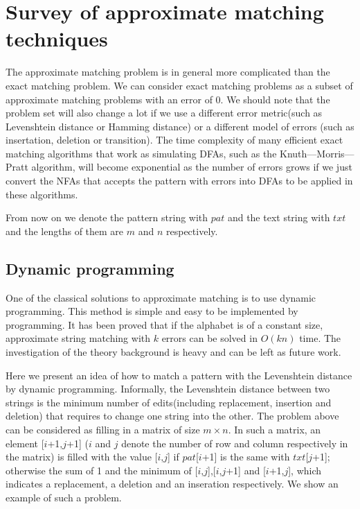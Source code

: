 \section{Survey of approximate matching techniques}
The approximate matching problem is in general more complicated than the exact matching problem. We can consider exact matching problems as a subset of approximate matching problems with an error of 0. We should note that the problem set will also change a lot if we use a different error metric(such as Levenshtein distance or Hamming distance) or a different model of errors (such as insertation, deletion or transition). The time complexity of many efficient exact matching algorithms that work as simulating DFAs, such as the Knuth--–Morris--–Pratt algorithm, will become exponential as the number of errors grows if we just convert the NFAs that accepts the pattern with errors into DFAs to be applied in these algorithms. 

From now on we denote the pattern string with $pat$ and the text string with $txt$ and  the lengths of them are $m$ and $n$ respectively.

\subsection{Dynamic programming}

One of the classical solutions to approximate matching is to use dynamic programming. This method is simple and easy to be implemented by programming. It has been proved that if the alphabet is of a constant size, approximate string matching with $k$ errors can be solved in $O(kn)$ time\cite{crochemore-jewels}. The investigation of the theory background is heavy and can be left as future work.

Here we present an idea of how to match a pattern with the Levenshtein distance by dynamic programming. Informally, the Levenshtein distance between two strings is the minimum number of edits(including replacement, insertion and deletion) that requires to change one string into the other. The problem above can be considered as filling in a matrix of size $m\times n$. In such a matrix, an element [$i$+1,$j$+1] ($i$ and $j$ denote the number of row and column respectively in the matrix) is filled with the value [$i$,$j$] if $pat$[$i$+1] is the same with $txt$[$j$+1]; otherwise the sum of 1 and the minimum of [$i$,$j$],[$i$,$j$+1] and [$i$+1,$j$], which indicates a replacement, a deletion and an inseration respectively. We show an example of such a problem.

